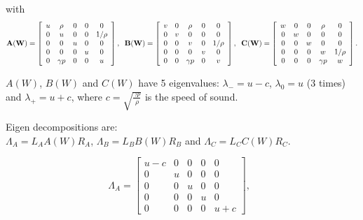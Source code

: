 \documentclass{article}
\begin{document}
with
\begin{equation}
  \mathbf{A(W)} = \left[
    \begin{array}{c c c c c}
      u & \rho     & 0 & 0 & 0 \\
      0 & u        & 0 & 0 & 1/\rho\\
      0 & 0        & u & 0 & 0 \\
      0 & 0        & 0 & u & 0 \\
      0 & \gamma p & 0 & 0 & u \\
    \end{array}
  \right],
  \;\;
  \mathbf{B(W)} = \left[
    \begin{array}{c c c c c}
      v & 0 & \rho     & 0 & 0 \\
      0 & v & 0        & 0 & 0\\
      0 & 0 & v        & 0 & 1/\rho \\
      0 & 0 & 0        & v & 0 \\
      0 & 0 & \gamma p & 0 & v \\
    \end{array}
  \right],
  \;\;
  \mathbf{C(W)} = \left[
    \begin{array}{c c c c c}
      w & 0 & 0 & \rho     & 0 \\
      0 & w & 0 & 0        & 0\\
      0 & 0 & w & 0        & 0 \\
      0 & 0 & 0 & w        & 1/\rho \\
      0 & 0 & 0 & \gamma p & w \\
    \end{array}
  \right].
\end{equation}

$A(W)$, $B(W)$ and $C(W)$ have 5 eigenvalues: $\lambda_{-}=u-c$, $\lambda_{0}=u$ (3 times) and $\lambda_{+}=u+c$, where $c=\sqrt{\frac{\gamma p}{\rho}}$ is the speed of sound. 

Eigen decompositions are:\\
$\Lambda_A = L_A A(W) R_A$, $\Lambda_B = L_B B(W) R_B$ and $\Lambda_C = L_C C(W) R_C$.


\begin{equation}
  \Lambda_A = \left[
    \begin{array}{ccccc}
      u-c& 0 & 0 & 0 & 0\\
      0  & u & 0 & 0 & 0\\
      0  & 0 & u & 0 & 0\\
      0  & 0 & 0 & u & 0\\
      0  & 0 & 0 & 0 & u+c
    \end{array}
  \right],\;\;
\end{equation}
\end{document}
